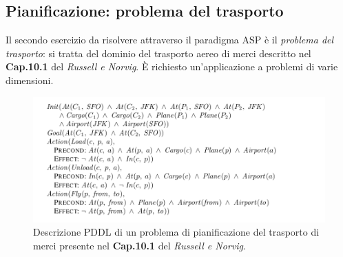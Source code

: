 \documentclass[a4paper,oneside,12pt]{book}
\begin{document}
    \subsection*{Pianificazione: problema del trasporto}
    Il secondo esercizio da risolvere attraverso il paradigma ASP è il \textit{problema del trasporto}:
    si tratta del dominio del trasporto aereo di merci descritto nel \textbf{Cap.10.1} del
    \textit{Russell e Norvig}.
    È richiesto un'applicazione a problemi di varie dimensioni.
    \begin{figure}[h!]
        \includegraphics[scale=0.5]{cargo.png}
        \caption{Descrizione PDDL di un problema di pianificazione del trasporto di merci
        presente nel \textbf{Cap.10.1} del \textit{Russell e Norvig}.}
        \label{fig:birds}
    \end{figure}
\end{document}
